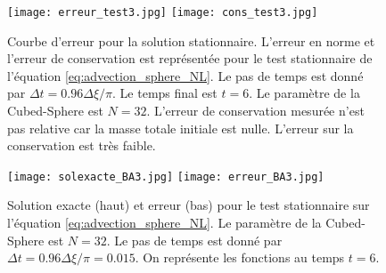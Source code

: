 \begin{figure}[htbp]
\begin{center}
\texttt{[image: erreur\_test3.jpg]}
\texttt{[image: cons\_test3.jpg]}
\end{center}
\caption{Courbe d'erreur pour la solution stationnaire. L'erreur en norme et l'erreur de conservation est représentée pour le test stationnaire de l'équation \eqref{eq:advection_sphere_NL}. Le pas de temps est donné par $\Delta t = 0.96 \Delta \xi / \pi$. Le temps final est $t=6$. Le paramètre de la Cubed-Sphere est $N=32$. L'erreur de conservation mesurée n'est pas relative car la masse totale initiale est nulle. L'erreur sur la conservation est très faible.}
\label{fig:benartzi_test3_hist}
\end{figure}

\begin{figure}[htbp]
\begin{center}
\texttt{[image: solexacte\_BA3.jpg]}
\texttt{[image: erreur\_BA3.jpg]}
\end{center}
\caption{Solution exacte (haut) et erreur (bas) pour le test stationnaire sur l'équation \eqref{eq:advection_sphere_NL}. Le paramètre de la Cubed-Sphere est $N=32$. Le pas de temps est donné par $\Delta t = 0.96 \Delta \xi / \pi = 0.015$. On représente les fonctions au temps $t=6$.}
\label{fig:benartzi_test3_sol}
\end{figure}


















